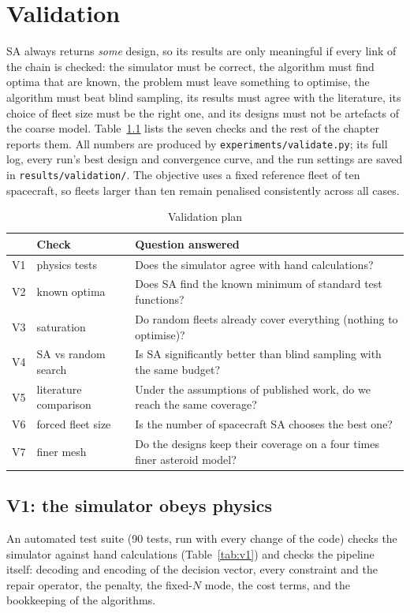 \chapter{Validation}
\label{ch:validation}

\ac{SA} always returns \emph{some} design, so its results are only meaningful if every link of the
chain is checked: the simulator must be correct, the algorithm must find optima that are known, the
problem must leave something to optimise, the algorithm must beat blind sampling, its results must
agree with the literature, its choice of fleet size must be the right one, and its designs must not
be artefacts of the coarse model. Table~\ref{tab:valplan} lists the seven checks and the rest of the
chapter reports them. All numbers are produced by \texttt{experiments/validate.py}; its full log,
every run's best design and convergence curve, and the run settings are saved in
\texttt{results/validation/}. The objective uses a fixed reference fleet of ten spacecraft, so
fleets larger than ten remain penalised consistently across all cases.

\begin{table}[htbp]
\centering
\caption{Validation plan}
\label{tab:valplan}
\footnotesize
\begin{tabularx}{\textwidth}{@{}p{0.7cm}p{3.3cm}X@{}}
\toprule
& Check & Question answered \\
\midrule
V1 & physics tests & Does the simulator agree with hand calculations? \\
V2 & known optima & Does \ac{SA} find the known minimum of standard test functions? \\
V3 & saturation & Do random fleets already cover everything (nothing to optimise)? \\
V4 & \ac{SA} vs random search & Is \ac{SA} significantly better than blind sampling with the same budget? \\
V5 & literature comparison & Under the assumptions of published work, do we reach the same coverage? \\
V6 & forced fleet size & Is the number of spacecraft \ac{SA} chooses the best one? \\
V7 & finer mesh & Do the designs keep their coverage on a four times finer asteroid model? \\
\bottomrule
\end{tabularx}
\end{table}

\section{V1: the simulator obeys physics}
\label{sec:v1}
An automated test suite (90 tests, run with every change of the code) checks the simulator against
hand calculations (Table~\ref{tab:v1}) and checks the pipeline itself: decoding and encoding of
the decision vector, every constraint and the repair operator, the penalty, the fixed-$N$ mode,
the cost terms, and the bookkeeping of the algorithms.

